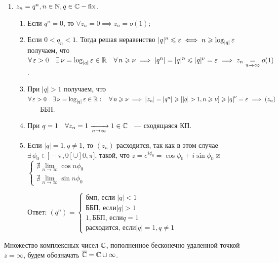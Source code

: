 \documentclass[../../main.tex]{subfiles}
\begin{document}
\begin{exmp}
	\;
	\begin{enumerate}
		\item $ z_n = q^n, n \in \mathbb{N}, q \in \mathbb{C} - \operatorname{fix} $.
		
		\begin{enumerate}
			\item Если $ q^n = 0 $, то $ \forall z_n = 0 \implies z_n = o(1) $;
			
			\item Если $ 0 < q_n < 1 $. Тогда решая неравенство $ |q|^n \leqslant \varepsilon \iff 
			n \geqslant \log_{|q|}\varepsilon $ получаем, что $ \forall\, \varepsilon > 0 \quad \exists\, 
			\nu = \log_{|q|}\varepsilon \in \mathbb{R} \quad \forall\, n \geqslant \nu \implies |q^n| = 
			|q|^n \leqslant |q|^\nu = \varepsilon \implies z_n \underset{n \to \infty}{=} o(1) $.
			
			\item При $ |q| > 1 $ получаем, что $ \forall\, \varepsilon > 0 \quad \exists\, 
			\nu = \log_{|q|}\varepsilon \in \mathbb{R}: \quad \forall\, n \geqslant \nu \implies |z_n| = 
			|q^n| \geqslant [|q| > 1, n \geqslant \nu] \geqslant {|q|}^{\nu} = \varepsilon \implies (z_n) $ 
			~--- ББП.
			
			\item При $ q = 1 \quad \forall z_n = 1 \xrightarrow[n \rightarrow \infty]{} 1 \in 
			\mathbb{C} $ ~--- сходящаяся КП.
			
			\item Если $ |q| = 1, q \neq 1 $, то $ (z_n) $ расходится, так как в этом 
			случае $ \exists\, \phi_0 \in ]-\pi, 0[ \cup ]0, \pi] $, такой, что $ z = 
			e^{i\phi_0} = \cos{\phi_0} + i\sin{\phi_0} $ и 
			$ \begin{cases}
				\nexists \underset{n \to \infty}{\lim} \cos{n\phi_0} \\
				\nexists \underset{n \to \infty}{\lim} \sin{n\phi_0}
			\end{cases} $
			
			Ответ: 
			$ (q^n) = \begin{cases}
				\text{бмп, если } |q| < 1 \\
				\text{ББП, если} |q| > 1 \\
				1, \text{ББП, если} q = 1 \\
				\text{расходится, если} |q| = 1, q \neq 1
			\end{cases} $
		\end{enumerate}
	\end{enumerate}
\end{exmp}

Множество комплексных чисел $ \mathbb{C} $, пополненное бесконечно удаленной точкой $ 
z = \infty $, будем обозначать $ \overline{\mathbb{C}} = \mathbb{C} \cup {\infty} $.
\end{document}
